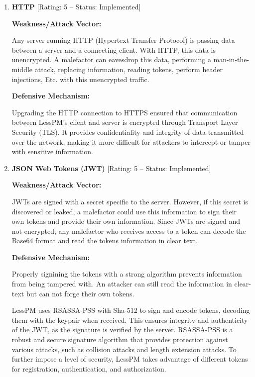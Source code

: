 \begin{enumerate}[label=$\blacktriangleright$]
  \item \textbf{HTTP} [Rating: 5 -- Status: Implemented]

  \textbf{Weakness/Attack Vector:}

  Any server running HTTP (Hypertext Transfer Protocol) is passing data
  between a server and a connecting client.
  With HTTP, this data is unencrypted.
  A malefactor can eavesdrop this data, performing a man-in-the-middle attack,
  replacing information, reading tokens, perform header injections, Etc.
  with this unencrypted traffic.

  \textbf{Defensive Mechanism:}

  Upgrading the HTTP connection to HTTPS ensured that communication between
  LessPM's client and server is encrypted through Transport Layer
  Security (TLS).
  It provides confidentiality and integrity of data transmitted over the
  network, making it more difficult for attackers to intercept or tamper with
  sensitive information.

  \item \textbf{JSON Web Tokens (JWT)} [Rating: 5 -- Status: Implemented]

  \textbf{Weakness/Attack Vector:}

  JWTs are signed with a secret specific to the server.
  However, if this secret is discovered or leaked, a malefactor could use this
  information to sign their own tokens and provide their own information.
  Since JWTs are signed and not encrypted, any malefactor who receives access
  to a token can decode the Base64 format and read the tokens information in
  clear text.

  \textbf{Defensive Mechanism:}

  Properly signining the tokens with a strong algorithm prevents information
  from being tampered with.
  An attacker can still read the information in clear-text but can not forge
  their own tokens.

  LessPM uses RSASSA-PSS with Sha-512 to sign and encode tokens, decoding
  them with the keypair when received.
  This ensures integrity and authenticity of the JWT, as the signature is
  verified by the server.
  RSASSA-PSS is a robust and secure signature algorithm that provides protection
  against various attacks, such as collision attacks and length extension
  attacks.
  To further impose a level of security, LessPM takes advantage of different
  tokens for registration, authentication, and authorization.


\end{enumerate}
